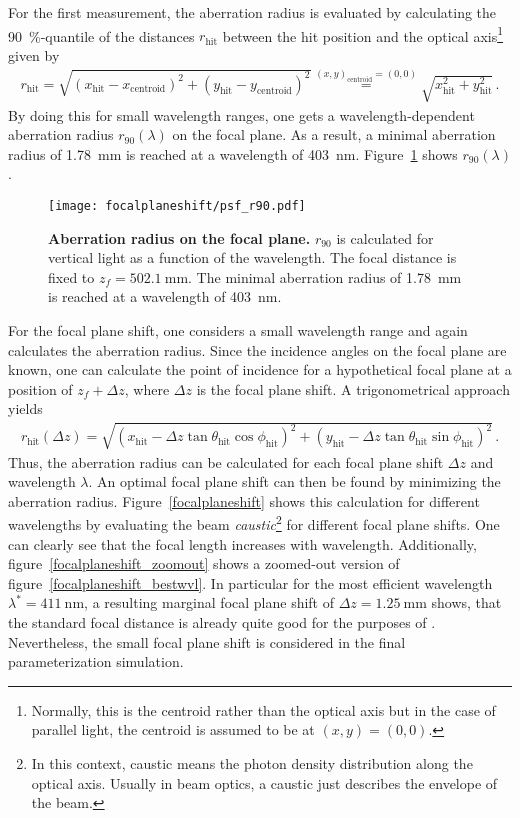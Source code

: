 For the first measurement, the aberration radius is evaluated by calculating the \SI{90}{\percent}-quantile of the distances $r_\text{hit}$ between the hit position and the optical axis\footnote{Normally, this is the centroid rather than the optical axis but in the case of parallel light, the centroid is assumed to be at $(x,y) = (0,0)$.} given by
\begin{align}
	r_\text{hit} = \sqrt{\left(x_\text{hit}-x_\text{centroid}\right)^2+\left(y_\text{hit}-y_\text{centroid}\right)^2} \overset{(x,y)_\text{centroid}=(0,0)}{=}\sqrt{x_\text{hit}^2+y_\text{hit}^2}\,.
\end{align}
By doing this for small wavelength ranges, one gets a wavelength-dependent aberration radius $r_{90}(\lambda)$ on the focal plane. As a result, a minimal aberration radius of \SI{1.78}{\milli\meter} is reached at a wavelength of \SI{403}{\nano\meter}. Figure~\ref{psf_at_focal_plane} shows $r_{90}(\lambda)$.\\

\begin{figure}[H]
	\centering
	\texttt{[image: focalplaneshift/psf\_r90.pdf]}
	\caption[Aberration radius on the focal plane]{\textbf{Aberration radius on the focal plane.} $r_{90}$ is calculated for vertical light as a function of the wavelength. The focal distance is fixed to $z_f=\SI{502.1}{\milli\meter}$. The minimal aberration radius of \SI{1.78}{\milli\meter} is reached at a wavelength of \SI{403}{\nano\meter}.}
	\label{psf_at_focal_plane}
\end{figure}

For the focal plane shift, one considers a small wavelength range and again calculates the aberration radius. Since the incidence angles on the focal plane are known, one can calculate the point of incidence for a hypothetical focal plane at a position of $z_f+\Delta z$, where $\Delta z$ is the focal plane shift. A trigonometrical approach yields
\begin{align}
	r_\text{hit}(\Delta z) = \sqrt{\left(x_\text{hit}-\Delta z\tan\theta_\text{hit}\cos\phi_\text{hit}\right)^2 + \left(y_\text{hit}-\Delta z\tan\theta_\text{hit}\sin\phi_\text{hit}\right)^2}\,.
\end{align}
Thus, the aberration radius can be calculated for each focal plane shift $\Delta z$ and wavelength $\lambda$. An optimal focal plane shift can then be found by minimizing the aberration radius. Figure~\ref{focalplaneshift} shows this calculation for different wavelengths by evaluating the beam \textit{caustic}\footnote{In this context, caustic means the photon density distribution along the optical axis. Usually in beam optics, a caustic just describes the envelope of the beam.} for different focal plane shifts. One can clearly see that the focal length increases with wavelength. Additionally, figure~\ref{focalplaneshift_zoomout} shows a zoomed-out version of figure~\ref{focalplaneshift_bestwvl}. In particular for the most efficient wavelength $\lambda^\ast=\SI{411}{\nano\meter}$, a resulting marginal focal plane shift of $\Delta z=\SI{1.25}{\milli\meter}$ shows, that the standard focal distance is already quite good for the purposes of \iceact. Nevertheless, the small focal plane shift is considered in the final parameterization simulation.

